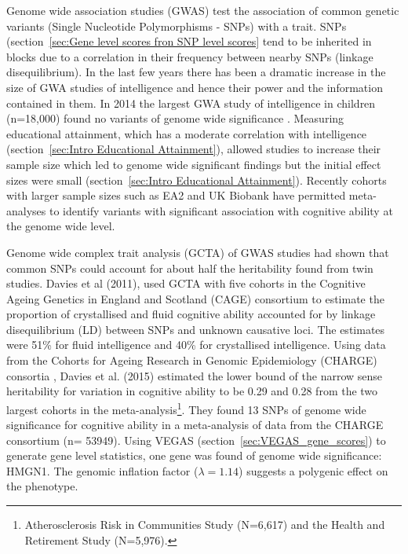 Genome wide association studies (GWAS) test the association of common genetic variants (Single Nucleotide Polymorphisms - SNPs) with a trait\cite{visscher201710}. SNPs (section~\ref{sec:Gene level scores fron SNP level scores} tend to be inherited in blocks due to a correlation in their frequency between nearby SNPs (linkage disequilibrium)\cite{reich2001linkage}. 
In the last few years there has been a dramatic increase in the size of GWA studies of intelligence and hence their power and the information contained in them. In 2014 the largest GWA study of intelligence in children (n=18,000) found no variants of genome wide significance 
\cite{benyamin2014childhood}.
Measuring educational attainment, which has a moderate correlation with intelligence (section~\ref{sec:Intro Educational Attainment}), allowed studies to increase their sample  size which led to genome wide significant findings but the initial effect sizes were small (section~\ref{sec:Intro Educational Attainment})\cite{rietveld2013gwas}. Recently cohorts with larger sample sizes such as EA2 \cite{okbay2016genome} and UK Biobank\cite{hill2019combined} have permitted meta-analyses to identify variants with significant association with cognitive ability at the genome wide level. 

Genome wide complex trait analysis (GCTA)
\cite{yang2011gcta} of GWAS studies had shown that common SNPs could account for about half the heritability found from twin studies. Davies et al (2011)\cite{davies2011genome}, used GCTA with five cohorts in the Cognitive Ageing Genetics in England and Scotland (CAGE) consortium to estimate the proportion of crystallised and fluid cognitive ability accounted for by linkage disequilibrium (LD) between SNPs and unknown causative loci. The estimates were 51\% for fluid intelligence and 40\% for crystallised intelligence.
Using data from the Cohorts for Ageing Research in Genomic Epidemiology %
(CHARGE) consortia %
\cite{psaty2009cohorts}, Davies et al. (2015)\cite{davies2015genetic} estimated the lower bound of the narrow sense heritability for variation in cognitive ability to be 0.29 and 0.28 from the two largest cohorts in the meta-analysis\footnote{Atherosclerosis Risk in Communities Study (N=6,617) and the Health and Retirement Study (N=5,976).}. They found 13 SNPs of genome wide significance for cognitive ability in a meta-analysis of data from the CHARGE consortium (n= 53949). Using VEGAS (section~\ref{sec:VEGAS_gene_scores}) to generate gene level statistics, one gene was found of genome wide significance: HMGN1. The genomic inflation factor ($\lambda=1.14$) suggests a polygenic effect on the phenotype.

